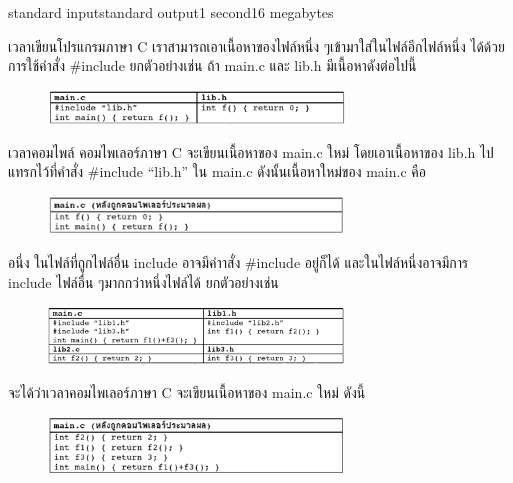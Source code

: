 \documentclass[11pt,a4paper]{article}
\begin{document}
\begin{problem}{}{standard input}{standard output}{1 second}{16 megabytes}

เวลาเขียนโปรแกรมภาษา C เราสามารถเอาเนื้อหาของไฟล์หนึ่ง ๆเข้ามาใส่ในไฟล์อีกไฟล์หนึ่ง ได้ด้วยการใช้คำสั่ง #include ยกตัวอย่างเช่น ถ้า main.c และ lib.h มีเนื้อหาดังต่อไปนี้

\begin{figure}[h!]
\centering
\includegraphics[width=0.7\textwidth]{../latex/img/1057/1057-1.png}
\end{figure}

เวลาคอมไพล์ คอมไพเลอร์ภาษา C จะเขียนเนื้อหาของ main.c ใหม่ โดยเอาเนื้อหาของ lib.h ไปแทรกไว้ที่คำสั่ง #include “lib.h” ใน main.c ดังนั้นเนื้อหาใหม่ของ main.c คือ

\begin{figure}[h!]
\centering
\includegraphics[width=0.7\textwidth]{../latex/img/1057/1057-2.png}
\end{figure}



อนึ่ง ในไฟล์ที่ถูกไฟล์อื่น include อาจมีคำาสั่ง #include อยู่ก็ได้ และในไฟล์หนี่งอาจมีการ include ไฟล์อื่น ๆมากกว่าหนึ่งไฟล์ได้ ยกตัวอย่างเช่น

\begin{figure}[h!]
\centering
\includegraphics[width=0.7\textwidth]{../latex/img/1057/1057-3.png}
\end{figure}

จะได้ว่าเวลาคอมไพเลอร์ภาษา C จะเขียนเนื้อหาของ main.c ใหม่ ดังนี้

\begin{figure}[h!]
\centering
\includegraphics[width=0.7\textwidth]{../latex/img/1057/1057-4.png}
\end{figure}



\end{problem}
\end{document}
